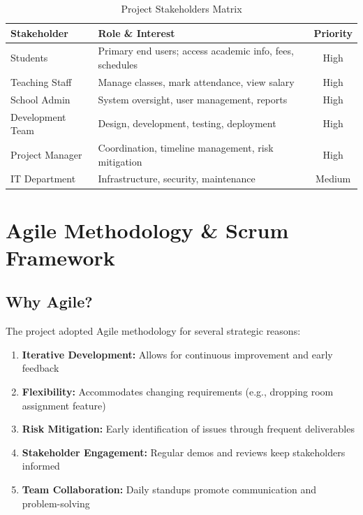 \documentclass[12pt,a4paper]{article}
\begin{document}
\begin{table}[H]
\centering
\begin{tabularx}{\textwidth}{|l|X|c|}
\hline
\textbf{Stakeholder} & \textbf{Role \& Interest} & \textbf{Priority} \\
\hline
Students & Primary end users; access academic info, fees, schedules & High \\
\hline
Teaching Staff & Manage classes, mark attendance, view salary & High \\
\hline
School Admin & System oversight, user management, reports & High \\
\hline
Development Team & Design, development, testing, deployment & High \\
\hline
Project Manager & Coordination, timeline management, risk mitigation & High \\
\hline
IT Department & Infrastructure, security, maintenance & Medium \\
\hline
\end{tabularx}
\caption{Project Stakeholders Matrix}
\end{table}

\section{Agile Methodology \& Scrum Framework}

\subsection{Why Agile?}

The project adopted Agile methodology for several strategic reasons:

\begin{enumerate}[noitemsep]
    \item \textbf{Iterative Development:} Allows for continuous improvement and early feedback
    \item \textbf{Flexibility:} Accommodates changing requirements (e.g., dropping room assignment feature)
    \item \textbf{Risk Mitigation:} Early identification of issues through frequent deliverables
    \item \textbf{Stakeholder Engagement:} Regular demos and reviews keep stakeholders informed
    \item \textbf{Team Collaboration:} Daily standups promote communication and problem-solving
\end{enumerate}
\end{document}
